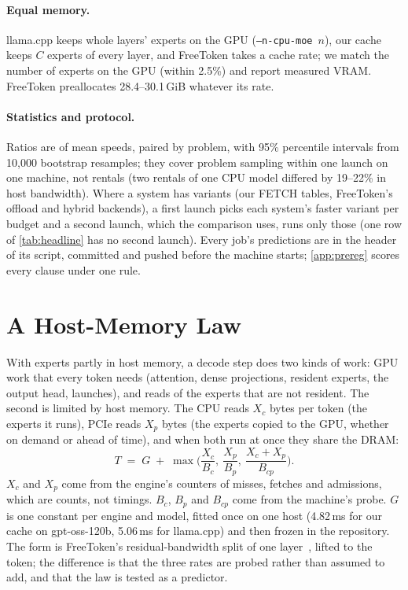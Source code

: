 \documentclass[10pt,twocolumn]{article}
\begin{document}
\paragraph{Equal memory.} llama.cpp keeps whole layers' experts on the GPU (\texttt{--n-cpu-moe}~$n$), our cache keeps
$C$ experts of every layer, and FreeToken takes a cache rate; we match the number of experts on the GPU (within
2.5\%) and report measured VRAM. FreeToken preallocates 28.4--30.1\,GiB whatever its rate.

\paragraph{Statistics and protocol.} Ratios are of mean speeds, paired by problem, with 95\% percentile intervals from
10{,}000 bootstrap resamples; they cover problem sampling within one launch on one machine, not rentals (two rentals
of one CPU model differed by 19--22\% in host bandwidth). Where a system has variants (our FETCH tables, FreeToken's
offload and hybrid backends), a first launch picks each system's faster variant per budget and a second launch, which
the comparison uses, runs only those (one row of \cref{tab:headline} has no second launch). Every job's predictions
are in the header of its script, committed and pushed before the machine starts; \cref{app:prereg} scores every
clause under one rule.

\section{A Host-Memory Law}\label{sec:law}
With experts partly in host memory, a decode step does two kinds of work: GPU work that every token needs (attention,
dense projections, resident experts, the output head, launches), and reads of the experts that are not resident. The
second is limited by host memory. The CPU reads $X_c$ bytes per token (the experts it runs), PCIe reads $X_p$ bytes
(the experts copied to the GPU, whether on demand or ahead of time), and when both run at once they share the DRAM:
\begin{equation}
T \;=\; G \;+\; \max\!\Big(\frac{X_c}{B_c},\ \frac{X_p}{B_p},\ \frac{X_c+X_p}{B_{cp}}\Big).
\label{eq:law}
\end{equation}
$X_c$ and $X_p$ come from the engine's counters of misses, fetches and admissions, which are counts, not timings.
$B_c$, $B_p$ and $B_{cp}$ come from the machine's probe. $G$ is one constant per engine and model, fitted once on one
host (4.82\,ms for our cache on gpt-oss-120b, 5.06\,ms for llama.cpp) and then frozen in the repository. The form is
FreeToken's residual-bandwidth split of one layer~\cite{freetoken}, lifted to the token; the difference is that the
three rates are probed rather than assumed to add, and that the law is tested as a predictor.
\end{document}
